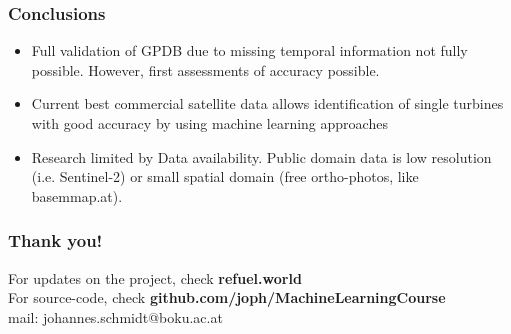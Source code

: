 \documentclass[color=usenames,dvipsnames]{beamer}
\begin{document}
\begin{frame}
\frametitle{Conclusions}
\begin{itemize}
 \item Full validation of GPDB due to missing temporal information not fully possible. However, first assessments of accuracy possible.
 \item Current best commercial satellite data allows identification of single turbines with good accuracy by using machine learning approaches
 \item Research limited by Data availability. Public domain data is low resolution (i.e. Sentinel-2) or small spatial domain (free ortho-photos, like basemmap.at).
\end{itemize}

\end{frame}




{


\begin{frame}
\frametitle{Thank you!}
\begin{block}{
 For updates on the project, check \textbf{refuel.world}\\
 For source-code, check \textbf{github.com/joph/MachineLearningCourse}\\
 
		mail: johannes.schmidt@boku.ac.at\\

}
\end{block}

\vspace{2.5 cm}


\end{frame}

}
\end{document}
